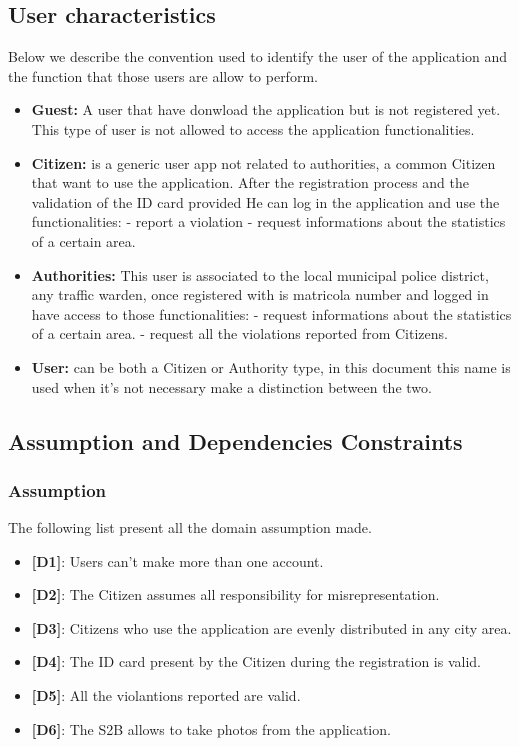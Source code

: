 \documentclass{article}
\begin{document}
\subsection{User characteristics}
Below we describe the convention used to identify the user of the application and the function that those 
users are allow to perform.
\begin{itemize}
    \item \textbf{Guest:} A user that have donwload the application but is not 
    registered yet. This type of user is not allowed to access 
    the application functionalities.
    \item \textbf{Citizen:} is a generic user app not related to authorities, a 
    common Citizen that want to use the application. After the
    registration process and the validation of the ID card provided
    He can log in the application and use the functionalities:
    - report a violation
    - request informations about the statistics of a certain area.
    \item \textbf{Authorities:} This user is associated to the local municipal
    police district, any traffic warden, once registered with 
    is matricola number and logged in have access to those 
    functionalities:
    - request informations about the statistics of a certain area.
    - request all the violations reported from Citizens. 
    \item \textbf{User:} can be both a Citizen or Authority type, in this document
    this name is used when it's not necessary make a distinction 
    between the two.
\end{itemize}

\subsection{Assumption and Dependencies Constraints}
\subsubsection{Assumption}
The following list present all the domain assumption made.
\begin{itemize}
    \item \textbf{[D1]}: Users can't make more than one account.
    \item \textbf{[D2]}: The Citizen assumes all responsibility for misrepresentation.
    \item \textbf{[D3]}: Citizens who use the application are evenly distributed in any city area.
    \item \textbf{[D4]}: The ID card present by the Citizen during the registration is valid.
    \item \textbf{[D5]}: All the violantions reported are valid.
    \item \textbf{[D6]}: The S2B allows to take photos from the application.
\end{itemize}
\end{document}
